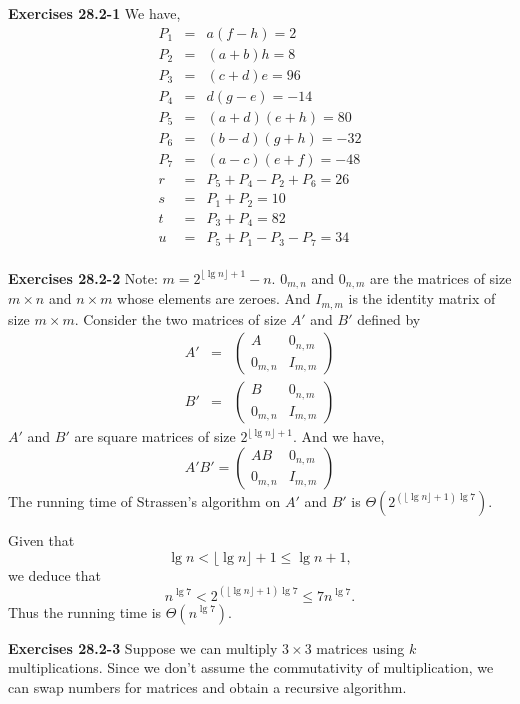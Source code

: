 \documentclass[a4paper,12pt]{article}
\newcommand{\newpar}[1]
{\bigskip \noindent \textbf{Exercises #1} \newline}
\begin{document}
\newpar{28.2-1}
We have,
\begin{eqnarray*}
  P_1 &=& a(f-h) = 2 \\
  P_2 &=& (a+b)h = 8 \\
  P_3 &=& (c+d)e = 96 \\
  P_4 &=& d(g-e) = -14 \\
  P_5 &=& (a+d)(e+h) = 80 \\
  P_6 &=& (b-d)(g+h) = -32 \\
  P_7 &=& (a-c)(e+f) = -48 \\
  r &=& P_5 + P_4 - P_2 + P_6 = 26 \\
  s &=& P_1 + P_2 = 10 \\
  t &=& P_3 + P_4 = 82 \\
  u &=& P_5 + P_1 - P_3 - P_7 = 34 \\
\end{eqnarray*}

\newpar{28.2-2}
Note: $m = 2^{\lfloor \lg n\rfloor+1} - n$.  $0_{m,n}$  and $0_{n,m}$
are the matrices of size $m\times n$ and $n\times m$ whose elements
are zeroes.  And $I_{m,m}$ is the identity matrix of size $m\times m$.
Consider the two matrices of size $A'$ and $B'$ defined by
\begin{eqnarray*}
A' &=& \left(
\begin{array}{ll}
  A&0_{n,m} \\
  0_{m,n}&I_{m,m}
\end{array} \right) \\
B' &=& \left(
\begin{array}{ll}
  B&0_{n,m} \\
  0_{m,n}&I_{m,m}
\end{array} \right)
\end{eqnarray*}
$A'$ and $B'$ are square matrices of size $2^{\lfloor \lg n\rfloor +
  1}$.  And we have,
\[ A'B' = \left(
\begin{array}{ll}
  AB&0_{n,m} \\
  0_{m,n}&I_{m,m}
\end{array} \right) \]
The running time of Strassen's algorithm on $A'$ and $B'$ is
$\Theta(2^{(\lfloor \lg n\rfloor+1)\lg 7}).$

Given that
\[ \lg n < \lfloor \lg n\rfloor+1 \le \lg n + 1,\]
we deduce that
\[ n^{\lg 7} < 2^{(\lfloor \lg n\rfloor+1)\lg 7} \le 7 n^{\lg 7}.\]
Thus the running time is $\Theta(n^{\lg 7})$.

\newpar{28.2-3}
Suppose we can multiply $3\times3$ matrices using $k$
multiplications. Since we don't assume the commutativity of
multiplication, we can swap numbers for matrices and obtain a
recursive algorithm.
\end{document}
